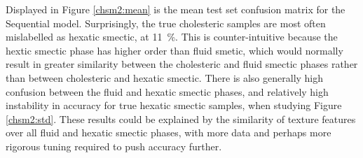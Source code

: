 \documentclass[12pt]{article}
\begin{document}
Displayed in Figure \ref{chsm2:mean} is the mean test set confusion matrix for the Sequential model. Surprisingly, the true cholesteric samples are most often mislabelled as hexatic smectic, at \SI{11}{\percent}. This is counter-intuitive because the hextic smectic phase has higher order than fluid smetic, which would normally result in greater similarity between the cholesteric and fluid smectic phases rather than between cholesteric and hexatic smectic. There is also generally high confusion between the fluid and hexatic smectic phases, and relatively high instability in accuracy for true hexatic smectic samples, when studying Figure \ref{chsm2:std}. These results could be explained by the similarity of texture features over all fluid and hexatic smectic phases, with more data and perhaps more rigorous tuning required to push accuracy further.
\end{document}
